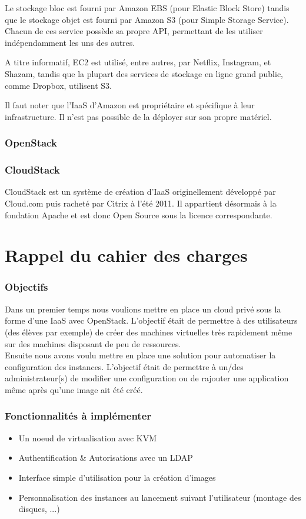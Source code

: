\documentclass[a4paper,oneside]{report}
\begin{document}
Le stockage bloc est fourni par Amazon EBS (pour Elastic Block Store) tandis que le stockage objet est fourni par Amazon S3 (pour Simple Storage Service).
Chacun de ces service possède sa propre API, permettant de les utiliser indépendamment les uns des autres.

A titre informatif, EC2 est utilisé, entre autres, par Netflix, Instagram, et Shazam, tandis que la plupart des services de stockage en ligne grand public, comme Dropbox, utilisent S3.

Il faut noter que l'IaaS d'Amazon est propriétaire et spécifique à leur infrastructure. Il n'est pas possible de la déployer sur son propre matériel.

\subsubsection{OpenStack}

\subsubsection{CloudStack}
CloudStack est un système de création d'IaaS originellement développé par Cloud.com puis racheté par Citrix à l'été 2011.
Il appartient désormais à la fondation Apache et est donc Open Source sous la licence correspondante.\newline


\section{Rappel du cahier des charges}
\subsubsection{Objectifs}
Dans un premier temps nous voulions mettre en place un cloud privé sous la forme d'une IaaS avec OpenStack.
L'objectif était de permettre à des utilisateurs (des élèves par exemple) de créer des machines virtuelles très rapidement même sur des machines disposant de peu de ressources.\\

Ensuite nous avons voulu mettre en place une solution pour automatiser la configuration des instances.
L'objectif était de permettre à un/des administrateur(s) de modifier une configuration ou de rajouter une application même après qu'une image ait été créé.

\subsubsection{Fonctionnalités à implémenter}
\begin{itemize}
\item Un noeud de virtualisation avec KVM
\item Authentification \& Autorisations avec un LDAP
\item Interface simple d'utilisation pour la création d'images
\item Personnalisation des instances au lancement suivant l'utilisateur (montage des disques, ...)
\end{itemize}
\end{document}
